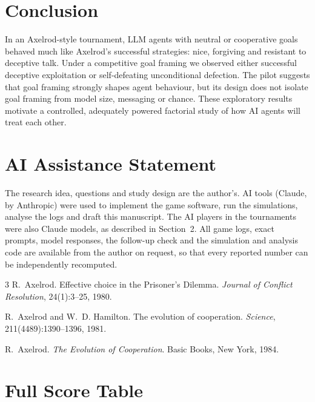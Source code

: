 \documentclass[11pt,a4paper]{article}
\begin{document}
\section{Conclusion}

In an Axelrod-style tournament, LLM agents with neutral or cooperative goals behaved much like Axelrod's successful strategies: nice, forgiving and resistant to deceptive talk. Under a competitive goal framing we observed either successful deceptive exploitation or self-defeating unconditional defection. The pilot suggests that goal framing strongly shapes agent behaviour, but its design does not isolate goal framing from model size, messaging or chance. These exploratory results motivate a controlled, adequately powered factorial study of how AI agents will treat each other.

\section*{AI Assistance Statement}
The research idea, questions and study design are the author's. AI tools (Claude, by Anthropic) were used to implement the game software, run the simulations, analyse the logs and draft this manuscript. The AI players in the tournaments were also Claude models, as described in Section~2. All game logs, exact prompts, model responses, the follow-up check and the simulation and analysis code are available from the author on request, so that every reported number can be independently recomputed.

\begin{thebibliography}{3}
R.~Axelrod.
\newblock Effective choice in the Prisoner's Dilemma.
\newblock \emph{Journal of Conflict Resolution}, 24(1):3--25, 1980.

R.~Axelrod and W.~D. Hamilton.
\newblock The evolution of cooperation.
\newblock \emph{Science}, 211(4489):1390--1396, 1981.

R.~Axelrod.
\newblock \emph{The Evolution of Cooperation}.
\newblock Basic Books, New York, 1984.
\end{thebibliography}

\appendix
\section{Full Score Table}
\label{app:scores}
\end{document}
